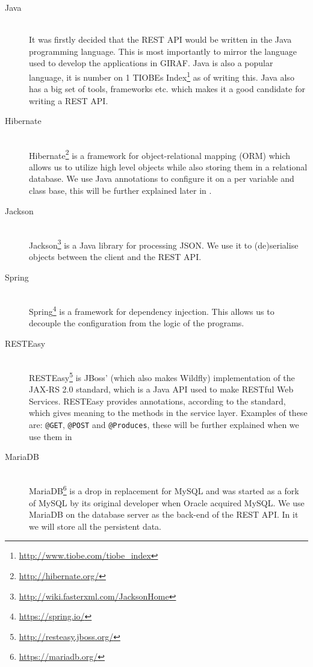 \begin{description}
    \item[Java] \hfill \\
        It was firstly decided that the REST API would be written in the Java programming language.
        This is most importantly to mirror the language used to develop the applications in GIRAF.
        Java is also a popular language, it is number on 1 TIOBEs Index\footnote{\url{http://www.tiobe.com/tiobe_index}} as of writing this.
        Java also has a big set of tools, frameworks etc. which makes it a good candidate for writing a REST API.

    \item[Hibernate] \hfill \\
        Hibernate\footnote{\url{http://hibernate.org/}} is a framework for object-relational mapping (ORM) which allows us to utilize high level objects while also storing them in a relational database.
        We use Java annotations to configure it on a per variable and class base, this will be further explained later in .

    \item[Jackson] \hfill \\
        Jackson\footnote{\url{http://wiki.fasterxml.com/JacksonHome}} is a Java library for processing JSON.
        We use it to (de)serialise objects between the client and the REST API.

    \item[Spring] \hfill \\
        Spring\footnote{\url{https://spring.io/}} is a framework for dependency injection.
        This allows us to decouple the configuration from the logic of the programs.

    \item[RESTEasy] \hfill \\
        RESTEasy\footnote{\url{http://resteasy.jboss.org/}} is JBoss' (which also makes Wildfly) implementation of the JAX-RS 2.0 standard, which is a Java API used to make RESTful Web Services.
        RESTEasy provides annotations, according to the standard, which gives meaning to the methods in the service layer.
        Examples of these are: \texttt{@GET}, \texttt{@POST} and \texttt{@Produces}, these will be further explained when we use them in 

    \item[MariaDB] \hfill \\
        MariaDB\footnote{\url{https://mariadb.org/}} is a drop in replacement for MySQL and was started as a fork of MySQL by its original developer when Oracle acquired MySQL.
        We use MariaDB on the database server as the back-end of the REST API.
        In it we will store all the persistent data.
\end{description}
